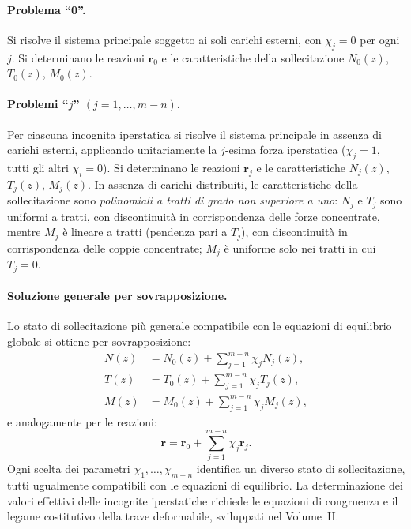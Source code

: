 \paragraph{Problema ``0''.}
Si risolve il sistema principale soggetto ai soli
carichi esterni, con $\chi_j = 0$ per ogni $j$.
Si determinano le reazioni $\bm{r}_0$ e le
caratteristiche della sollecitazione $N_0(z)$,
$T_0(z)$, $M_0(z)$.

\paragraph{Problemi ``$j$'' $(j = 1,\ldots,m-n)$.}
Per ciascuna incognita iperstatica si risolve il
sistema principale in assenza di carichi esterni,
applicando unitariamente la $j$-esima forza
iperstatica ($\chi_j = 1$, tutti gli altri
$\chi_i = 0$). Si determinano le reazioni
$\bm{r}_j$ e le caratteristiche $N_j(z)$,
$T_j(z)$, $M_j(z)$. In assenza di carichi
distribuiti, le caratteristiche della
sollecitazione sono \emph{polinomiali a tratti
	di grado non superiore a uno}: $N_j$ e $T_j$
sono uniformi a tratti, con discontinuità in
corrispondenza delle forze concentrate, mentre
$M_j$ è lineare a tratti (pendenza pari a $T_j$),
con discontinuità in corrispondenza delle coppie
concentrate; $M_j$ è uniforme solo nei tratti in
cui $T_j = 0$.

\paragraph{Soluzione generale per sovrapposizione.}
Lo stato di sollecitazione più generale
compatibile con le equazioni di equilibrio
globale si ottiene per sovrapposizione:
\begin{equation}
	\begin{aligned}
		N(z) &= N_0(z) + \sum_{j=1}^{m-n}
		\chi_j N_j(z), \\
		T(z) &= T_0(z) + \sum_{j=1}^{m-n}
		\chi_j T_j(z), \\
		M(z) &= M_0(z) + \sum_{j=1}^{m-n}
		\chi_j M_j(z),
	\end{aligned}
\end{equation}
e analogamente per le reazioni:
\begin{equation}
	\bm{r} = \bm{r}_0 + \sum_{j=1}^{m-n}
	\chi_j \bm{r}_j.
\end{equation}
Ogni scelta dei parametri $\chi_1, \ldots,
\chi_{m-n}$ identifica un diverso stato di
sollecitazione, tutti ugualmente compatibili
con le equazioni di equilibrio. La determinazione
dei valori effettivi delle incognite iperstatiche
richiede le equazioni di congruenza e il legame
costitutivo della trave deformabile, sviluppati
nel Volume~II.

